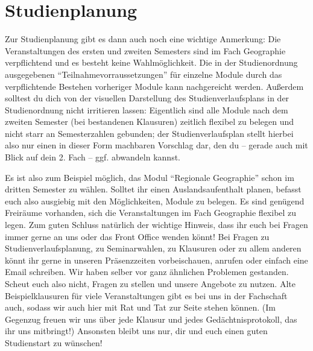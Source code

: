 \section*{Studienplanung}
Zur Studienplanung gibt es dann auch noch eine wichtige Anmerkung:
Die Veranstaltungen des ersten und zweiten Semesters sind im Fach Geographie verpflichtend und es besteht keine Wahlmöglichkeit. Die in der Studienordnung ausgegebenen "`Teilnahmevorraussetzungen"' für einzelne Module durch das verpflichtende Bestehen vorheriger Module kann nachgereicht werden. Außerdem solltest du dich von der visuellen Darstellung des Studienverlaufsplans in der Studienordnung nicht irritieren lassen: Eigentlich sind alle Module nach dem zweiten Semester (bei bestandenen Klausuren) zeitlich flexibel zu belegen und nicht starr an Semesterzahlen gebunden; der Studienverlaufsplan stellt hierbei also nur einen in dieser Form machbaren Vorschlag dar, den du -- gerade auch mit Blick auf dein 2. Fach -- ggf. abwandeln kannst.

Es ist also zum Beispiel möglich, das Modul \enquote{Regionale Geographie} schon im dritten Semester zu wählen. Solltet ihr einen Auslandsaufenthalt planen, befasst euch also ausgiebig mit den Möglichkeiten, Module zu belegen. Es sind genügend Freiräume vorhanden, sich die Veranstaltungen im Fach Geographie flexibel zu legen. Zum guten Schluss natürlich der wichtige Hinweis, dass ihr euch bei Fragen immer gerne an uns oder das Front Office wenden könnt! Bei Fragen zu Studienverlaufsplanung, zu Seminarwahlen, zu Klausuren oder zu allem anderen könnt ihr gerne in unseren Präsenzzeiten vorbeischauen, anrufen oder einfach eine Email schreiben. Wir haben selber vor ganz ähnlichen Problemen gestanden. Scheut euch also nicht, Fragen zu stellen und unsere Angebote zu nutzen. Alte Beispielklausuren für viele Veranstaltungen gibt es bei uns in der Fachschaft auch, sodass wir auch hier mit Rat und Tat zur Seite stehen können. (Im Gegenzug freuen wir uns über jede Klausur und jedes Gedächtnisprotokoll, das ihr uns mitbringt!) Ansonsten bleibt uns nur, dir und euch einen guten Studienstart zu wünschen!